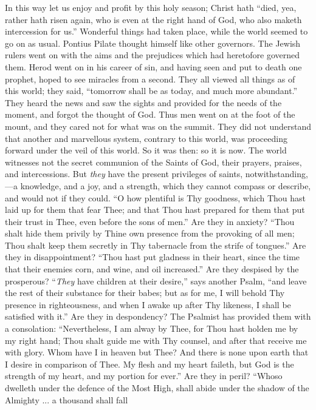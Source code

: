 In this way let us enjoy and profit by this holy season; Christ
hath ``died, yea, rather hath risen again, who is even at the
right hand of God, who also maketh intercession for us.''
Wonderful things had taken place, while the world seemed to go on as
usual. Pontius Pilate thought himself like other governors. The Jewish
rulers went on with the aims and the prejudices which had heretofore
governed them. Herod went on in his career of sin, and having seen and
put to death one prophet, hoped to see miracles from a second. They
all viewed all things as of this world; they said, ``tomorrow
shall be as today, and much more abundant.'' They heard the news
and saw the sights and provided for the needs of the moment, and
forgot the thought of God. Thus men went on at the foot of the mount,
and they cared not for what was on the summit. They did not understand
that another and marvellous system, contrary to this world, was
proceeding forward under the veil of this world. So it was then: so it
is now. The world witnesses not the secret communion of the Saints of
God, their prayers, praises, and intercessions. But \emph{they} have
the present privileges of saints, notwithstanding,—a knowledge, and
a joy, and a strength, which they cannot compass or describe, and
would not if they could. ``O how plentiful is Thy goodness, which
Thou hast laid up for them that fear Thee; and that Thou hast prepared
for them that put their trust in Thee, even before the sons of
men.'' Are they in anxiety? ``Thou shalt hide them privily by
Thine own presence from the provoking of all men; Thou shalt keep them
secretly in Thy tabernacle from the strife of tongues.'' Are they
in disappointment? ``Thou hast put gladness in their heart, since
the time that their enemies corn, and wine, and oil increased.''
Are they despised by the prosperous? ``\emph{They} have children
at their desire,'' says another Psalm, ``and leave the rest of
their substance for their babes; but as for me, I will behold Thy
presence in righteousness, and when I awake up after Thy likeness, I
shall be satisfied with it.'' Are they in despondency? The
Psalmist has provided them with a consolation: ``Nevertheless, I
am alway by Thee, for Thou hast holden me by my right hand; Thou shalt
guide me with Thy counsel, and after that receive me with glory. Whom
have I in heaven but Thee? And there is none upon earth that I desire
in comparison of Thee. My flesh and my heart faileth, but God is the
strength of my heart, and my portion for ever.'' Are they in
peril? ``Whoso dwelleth under the defence of the Most High, shall
abide under the shadow of the Almighty ... a thousand shall fall
